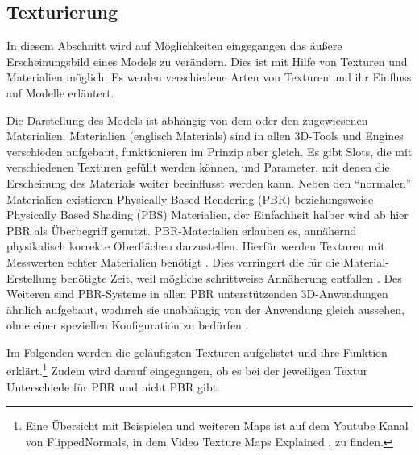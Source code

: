 \subsection{Texturierung}\label{Texturierung1}
In diesem Abschnitt wird auf Möglichkeiten eingegangen das äußere Erscheinungsbild eines Models zu verändern. Dies ist mit Hilfe von Texturen und Materialien möglich. Es werden verschiedene Arten von Texturen und ihr Einfluss auf Modelle erläutert.
\par
Die Darstellung des Models ist abhängig von dem oder den zugewiesenen Materialien. Materialien (englisch Materials) sind in allen 3D-Tools und Engines verschieden aufgebaut, funktionieren im Prinzip aber gleich. Es gibt Slots, die mit verschiedenen Texturen gefüllt werden können, und Parameter, mit denen die Erscheinung des Materials weiter beeinflusst werden kann.
\newpage
Neben den \enquote{normalen} Materialien existieren Physically Based Rendering (PBR) beziehungsweise Physically Based Shading (PBS) Materialien, der Einfachheit halber wird ab hier PBR als Überbegriff genutzt. PBR-Materialien erlauben es, annähernd physikalisch korrekte Oberflächen darzustellen. Hierfür werden Texturen mit Messwerten echter Materialien benötigt \parencite[S.\,490-492]{blender}. Dies verringert die für die Material-Erstellung benötigte Zeit, weil mögliche schrittweise Annäherung entfallen \parencite[S.\,490-492]{blender}. Des Weiteren sind PBR-Systeme in allen PBR unterstützenden 3D-Anwendungen ähnlich aufgebaut, wodurch sie unabhängig von der Anwendung gleich aussehen, ohne einer speziellen Konfiguration zu bedürfen \parencite[S.\,490-492]{blender}.  
\par
Im Folgenden werden die geläufigsten Texturen aufgelistet und ihre Funktion erklärt.\footnote{Eine Übersicht mit Beispielen und weiteren Maps ist auf dem Youtube Kanal von FlippedNormals, in dem Video Texture Maps Explained \parencite{flipped}, zu finden.} Zudem wird darauf eingegangen, ob es bei der jeweiligen Textur Unterschiede für PBR und nicht PBR gibt.
